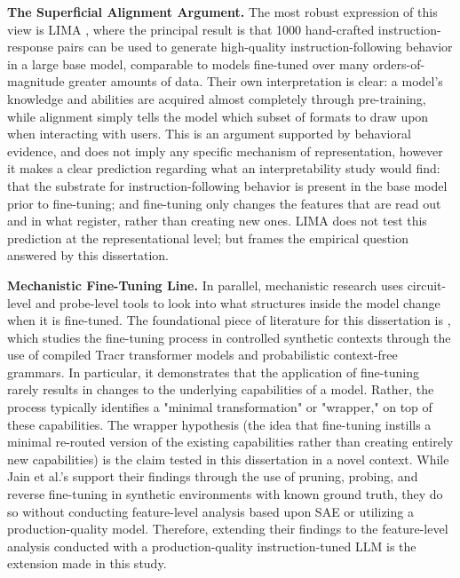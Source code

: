 \textbf{The Superficial Alignment Argument.} The most robust expression of this view is LIMA \parencite{zhou_lima_2023}, where the principal result is that 1000 hand-crafted instruction-response pairs can be used to generate high-quality instruction-following behavior in a large base model, comparable to models fine-tuned over many orders-of-magnitude greater amounts of data. Their own interpretation is clear: a model's knowledge and abilities are acquired almost completely through pre-training, while alignment simply tells the model which subset of formats to draw upon when interacting with users. This is an argument supported by behavioral evidence, and does not imply any specific mechanism of representation, however it makes a clear prediction regarding what an interpretability study would find: that the substrate for instruction-following behavior is present in the base model prior to fine-tuning; and fine-tuning only changes the features that are read out and in what register, rather than creating new ones. LIMA does not test this prediction at the representational level; but frames the empirical question answered by this dissertation.

\textbf{Mechanistic Fine-Tuning Line.} In parallel, mechanistic research uses circuit-level and probe-level tools to look into what structures inside the model change when it is fine-tuned. The foundational piece of literature for this dissertation is \textcite{jain_mechanistically_2024}, which studies the fine-tuning process in controlled synthetic contexts through the use of compiled Tracr transformer models and probabilistic context-free grammars. In particular, it demonstrates that the application of fine-tuning rarely results in changes to the underlying capabilities of a model. Rather, the process typically identifies a "minimal transformation" or "wrapper," on top of these capabilities. The wrapper hypothesis (the idea that fine-tuning instills a minimal re-routed version of the existing capabilities rather than creating entirely new capabilities) is the claim tested in this dissertation in a novel context. While Jain et al.'s support their findings through the use of pruning, probing, and reverse fine-tuning in synthetic environments with known ground truth, they do so without conducting feature-level analysis based upon SAE or utilizing a production-quality model. Therefore, extending their findings to the feature-level analysis conducted with a production-quality instruction-tuned LLM is the extension made in this study.

